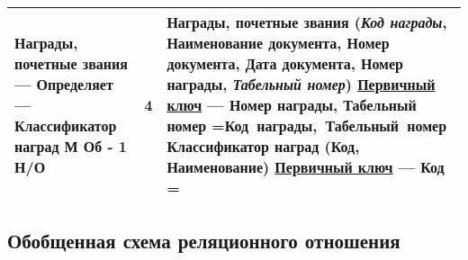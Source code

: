 \documentclass[10pt, a4paper, titlepage]{article}
\newcommand{\pk}[1]{\textbf{#1}}
\newcommand{\fk}[1]{\textit{#1}}
\newcommand{\pfk}[1]{\pk{\fk{#1}}}
\newcommand{\firstColumn}[4]{#1 --- \newline #2 --- \newline #3 \newline\newline #4}
\newcommand{\thirdColumn}[6]{
#1 \newline 
\underline{Первичный ключ} --- #2 \newline 
\setbox0=\hbox{#3\unskip}\ifdim\wd0=0pt
\else
  \underline{Внешний(е) ключ(-и)}: #3 \newline
\fi
#4 \newline 
\underline{Первичный ключ} --- #5 \newline
\setbox0=\hbox{#6\unskip}\ifdim\wd0=0pt
\else
  \underline{Внешний(е) ключ(-и)}: #6 \newline
\fi
}
\newcommand\ruleManyMondatoryOneOptionalNum{4}
\newcommand\ruleManyMondatoryOneOptional{М Об - 1 Н/О}
\newcommand\nagradiPochetnieZvaniya{Награды, почетные звания (\fk{Код награды}, Наименование документа, Номер документа, Дата документа, \pk{Номер награды}, \pfk{Табельный номер})}
\newcommand\nagradiPochetnieZvaniyaPK{Номер награды, Табельный номер}
\newcommand\nagradiPochetnieZvaniyaFK{Код награды, Табельный номер}
\newcommand\kNagrad{Классификатор наград (\pk{Код}, Наименование)}
\newcommand\kNagradPK{Код}
\newcommand\kNagradFK{}
\begin{document}
\begin{center}
\begin{longtable}{ | m{} | m{}| m{} | }
 \hline
 \firstColumn{Награды, почетные звания}{Определяет}{Классификатор наград}{\ruleManyMondatoryOneOptional} & \ruleManyMondatoryOneOptionalNum & \thirdColumn{\nagradiPochetnieZvaniya}{\nagradiPochetnieZvaniyaPK}{\nagradiPochetnieZvaniyaFK}{\kNagrad}{\kNagradPK}{\kNagradFK} \\ 
 
 
 \hline
\end{longtable}
\end{center}

\subsection{Обобщенная схема реляционного отношения}
\end{document}

